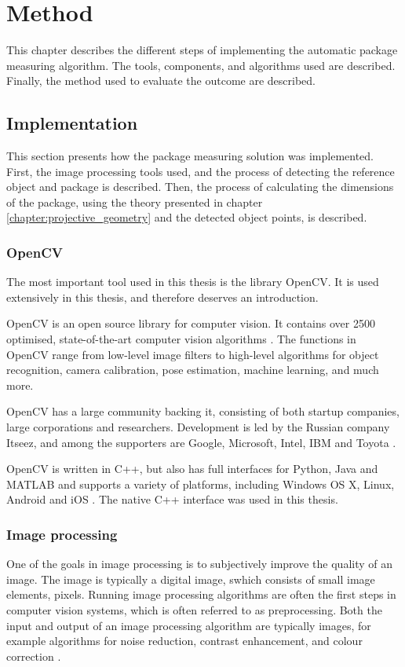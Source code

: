 \chapter{Method}
This chapter describes the different steps of implementing the automatic package measuring algorithm.
The tools, components, and algorithms used are described.
Finally, the method used to evaluate the outcome are described.

\section{Implementation} \label{method:implementation}
This section presents how the package measuring solution was implemented.
First, the image processing tools used, and the process of detecting the reference object and package is described.
Then, the process of calculating the dimensions of the package, using the theory presented in chapter \ref{chapter:projective_geometry} and the detected object points, is described.

\subsection{OpenCV}
The most important tool used in this thesis is the library OpenCV.
It is used extensively in this thesis, and therefore deserves an introduction.

OpenCV is an open source library for computer vision.
It contains over 2500 optimised, state-of-the-art computer vision algorithms \cite{opencv_about}.
The functions in OpenCV range from low-level image filters to high-level algorithms for object recognition, camera calibration, pose estimation, machine learning, and much more.

OpenCV has a large community backing it, consisting of both startup companies, large corporations and researchers.
Development is led by the Russian company Itseez, and among the supporters are Google, Microsoft, Intel, IBM and Toyota \cite{opencv_about}. 

OpenCV is written in C++, but also has full interfaces for Python, Java and MATLAB and supports a variety of platforms, including Windows OS X, Linux, Android and iOS \cite{opencv_about}.
The native C++ interface was used in this thesis.

\subsection{Image processing}
One of the goals in image processing is to subjectively improve the quality of an image. 
The image is typically a digital image, swhich consists of small image elements, pixels.
Running image processing algorithms are often the first steps in computer vision systems, which is often referred to as preprocessing.
Both the input and output of an image processing algorithm are typically images, for example algorithms for noise reduction, contrast enhancement, and colour correction \cite[p. 1-2]{gonzalez-woods}. 

